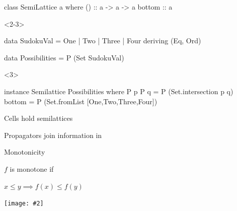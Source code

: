 \documentclass[UKenglish,usenames,dvipsnames,svgnames,table,aspectratio=169,mathserif]{beamer}
\newcommand{\nl}{\vspace{\baselineskip}}
\newcommand{\imageslide}[2][1]{{
\begin{frame}\begin{center}
\texttt{[image: \#2]}
\end{center}\end{frame}
}}
\begin{document}
\begin{frame}[fragile]

\begin{overlayarea}{\textwidth}{0.5\textheight}
\begin{haskellcode}
class SemiLattice a where
  (\/)   :: a -> a -> a
  bottom :: a
\end{haskellcode}
\nl

\begin{onlyenv}<2-3>
\begin{haskellcode}
data SudokuVal = One | Two | Three | Four
  deriving (Eq, Ord)

data Possibilities = P (Set SudokuVal)
\end{haskellcode}
\end{onlyenv}
\nl
\begin{onlyenv}<3>
\begin{haskellcode}
instance Semilattice Possibilities where
  P p \/ P q = P (Set.intersection p q)
  bottom = P (Set.fromList [One,Two,Three,Four])
\end{haskellcode}
\end{onlyenv}
\end{overlayarea}
\end{frame}


\begin{frame}
\LARGE \centering

Cells hold semilattices

Propagators join information in
\end{frame}

\begin{frame}
\centering \huge
Monotonicity
\nl

\Large
$f$ is monotone if\\
\nl

$ x \leq y \implies f(x) \leq f(y)$

\end{frame}


\imageslide[0.4]{monotonic.png}
\end{document}
